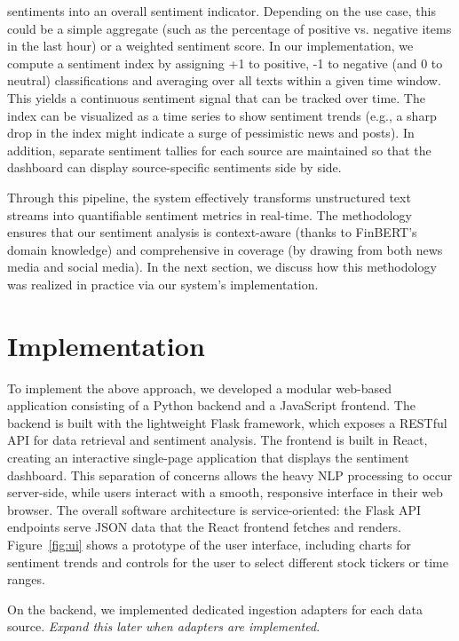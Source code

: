 \documentclass[12pt]{article}
\begin{document}
\begin{enumerate}
        sentiments into an overall sentiment indicator. Depending on the use case, this could be a simple
        aggregate (such as the percentage of positive vs. negative items in the last hour) or a weighted
        sentiment score. In our implementation, we compute a sentiment index by assigning +1 to positive, -1
        to negative (and 0 to neutral) classifications and averaging over all texts within a given time
        window. This yields a continuous sentiment signal that can be tracked over time. The index can be
        visualized as a time series to show sentiment trends (e.g., a sharp drop in the index might indicate
        a surge of pessimistic news and posts). In addition, separate sentiment tallies for each source are
        maintained so that the dashboard can display source-specific sentiments side by side.
\end{enumerate}

Through this pipeline, the system effectively transforms unstructured text streams into quantifiable
sentiment metrics in real-time. The methodology ensures that our sentiment analysis is context-aware (thanks
to FinBERT's domain knowledge) and comprehensive in coverage (by drawing from both news media and social
media). In the next section, we discuss how this methodology was realized in practice via our system's
implementation.

\section{Implementation}
To implement the above approach, we developed a modular web-based application consisting of a Python backend
and a JavaScript frontend. The backend is built with the lightweight Flask framework, which exposes a RESTful
API for data retrieval and sentiment analysis. The frontend is built in React, creating an interactive
single-page application that displays the sentiment dashboard. This separation of concerns allows the heavy
NLP processing to occur server-side, while users interact with a smooth, responsive interface in their web
browser. The overall software architecture is service-oriented: the Flask API endpoints serve JSON data that
the React frontend fetches and renders. Figure~\ref{fig:ui} shows a prototype of the user
interface, including charts for sentiment trends and controls for the user to select different stock tickers or time ranges.

On the backend, we implemented dedicated ingestion adapters for each data source. \textit{Expand this later
when adapters are implemented}.
\end{document}
